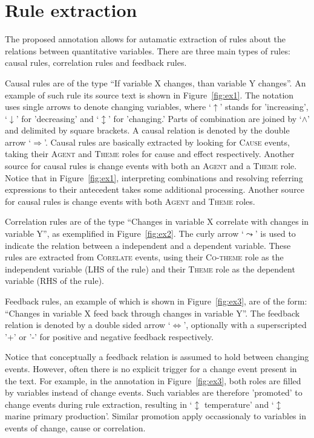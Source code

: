 \documentclass[10pt, a4paper]{article}
\newcommand{\tag}[1]{\textsc{#1}}
\begin{document}
\section{Rule extraction}
\label{sec:extraction}

The proposed annotation allows for autamatic extraction of rules about the relations between quantitative variables.
There are three main types of rules: causal rules, correlation rules and feedback rules.

Causal rules are of the type ``If variable X changes, than variable Y changes''.
An example of such rule its source text is shown in Figure~\ref{fig:ex1}.
The notation uses single arrows to denote changing variables, where `$\uparrow$' stands for 'increasing', `$\downarrow$' for 'decreasing' and `$\updownarrow$' for 'changing.'
Parts of combination are joined by `$\wedge$' and delimited by square brackets.
A causal relation is denoted by the double arrow `$\Longrightarrow$'.
Causal rules are basically extracted by looking for \tag{Cause} events, taking their \tag{Agent} and \tag{Theme} roles for cause and effect respectively.
Another source for causal rules is change events with both an \tag{Agent} and a \tag{Theme} role.
Notice that in Figure~\ref{fig:ex1}, interpreting combinations and resolving referring expressions to their antecedent takes some additional processing.
Another source for causal rules is change events with both \tag{Agent} and \tag{Theme} roles.

Correlation rules are of the type ``Changes in variable X correlate with changes in variable Y'', as exemplified in Figure~\ref{fig:ex2}.
The curly arrow `$\leadsto$' is used to indicate the relation between a independent and a dependent variable.
These rules are extracted from \tag{Corelate} events, using their \tag{Co-theme} role as the independent variable (LHS of the rule) and their \tag{Theme} role as the dependent variable (RHS of the rule). 

Feedback rules, an example of which is shown in Figure~\ref{fig:ex3}, are of the form: ``Changes in variable X feed back through changes in variable Y''.
The feedback relation is denoted by a double sided arrow `$\Longleftrightarrow$', optionally with a superscripted '+' or '-' for positive and negative feedback respectively.

Notice that conceptually a feedback relation is assumed to hold between changing events.
However, often there is no explicit trigger for a change event present in the text.
For example, in the annotation in Figure~\ref{fig:ex3}, both roles are filled by variables instead of change events.
Such variables are therefore 'promoted' to change events during rule extraction, resulting in `$\updownarrow$ temperature' and `$\updownarrow$ marine primary production'.
Similar promotion apply occassionaly to variables in events of change, cause or correlation.
\end{document}
